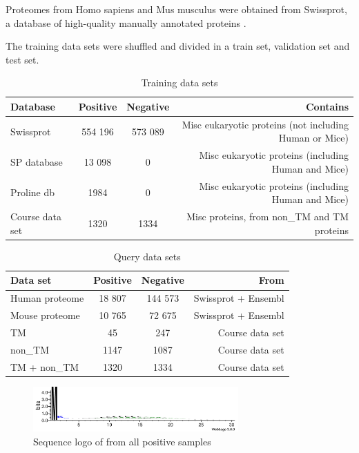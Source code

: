 Proteomes from Homo sapiens and Mus musculus were obtained from Swissprot, a database of high-quality manually annotated proteins \cite{swissprot}.

The training data sets were shuffled and divided in a train set, validation set and test set.

\begin{table}[H]
\centering
\begin{tabular}{l | c | c | r} %
Database & Positive & Negative & Contains\\\hline
Swissprot & 554 196 & 573 089 & Misc eukaryotic proteins (not including Human or Mice) \\
SP database & 13 098 & 0 & Misc eukaryotic proteins (including Human and Mice) \\
Proline db & 1984 & 0 & Misc eukaryotic proteins (including Human and Mice) \\
Course data set & 1320 & 1334 & Misc proteins, from non\_TM and TM proteins \\
\end{tabular}
\caption{\label{tab:dataset_table}Training data sets}
\end{table}

\begin{table}[H]
\centering
\begin{tabular}{l | c | c | r}
Data set & Positive & Negative & From\\\hline
Human proteome & 18 807 & 144 573 & Swissprot + Ensembl \\
Mouse proteome & 10 765 & 72 675 & Swissprot + Ensembl \\
TM & 45 & 247 & Course data set \\
non\_TM & 1147 & 1087 & Course data set \\
TM + non\_TM & 1320 & 1334 & Course data set \\
\end{tabular}
\caption{\label{tab:dataset_table}Query data sets}
\end{table}

\begin{figure}[H]
\centering
\includegraphics[width=0.7\textwidth]{pictures/train_pos_logo.png}
\caption{\label{fig:pos_seqlogo}Sequence logo of from all positive samples \cite{web_logo}}
\end{figure}

